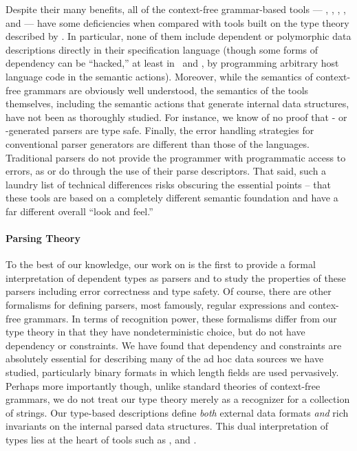Despite their many benefits, 
all of the context-free grammar-based tools --- \lex{}, \yacc, 
\antlr, \sablecc, and \demeter{} --- have some deficiencies when compared with
tools built on the type theory described by \ddc. 
In particular, none of them include dependent or 
polymorphic data descriptions directly in their specification language
(though some forms of dependency can be ``hacked,'' at least in
\lex\ and \yacc, by programming arbitrary host language 
code in the semantic actions).  Moreover, while the semantics of
context-free grammars are obviously well understood, the semantics of the
tools themselves, including the semantic actions that generate 
internal data structures, have not been as thoroughly studied.
For instance, we know of no proof that \antlr{}- or 
\sablecc{}-generated parsers are type safe.
Finally, the error handling strategies for conventional
parser generators are different than
those of the \pads{} languages.  Traditional parsers 
do not provide the programmer with
programmatic access to errors, as \padsml{} or \padsc{} do through the
use of their parse
descriptors.  That said, such a laundry list of technical differences risks
obscuring the essential points -- that these tools are based on a 
completely different semantic foundation and have a far different
overall ``look and feel.'' 


\paragraph*{Parsing Theory}
To the best of our knowledge, our work on \ddc{} is the first to
provide a formal interpretation of dependent types as parsers and to
study the properties of these parsers including error correctness and
type safety. Of course, there are other formalisms for defining
parsers, most famously, regular expressions and contex-free grammars.
In terms of recognition power, these formalisms differ from our type
theory in that they have nondeterministic choice, but do not have
dependency or constraints.  We have found that dependency and
constraints are absolutely essential for describing many of the ad hoc
data sources we have studied, particularly binary formats in which
length fields are used pervasively.  Perhaps more importantly though, unlike
standard theories of context-free grammars, we do not treat our type
theory merely as a recognizer for a collection of strings.  Our
type-based descriptions define {\em both} external data formats {\em
  and} rich invariants on the internal parsed data structures.  This
dual interpretation of types lies at the heart of tools such as \pads,
\datascript{} and \packettypes{}.

